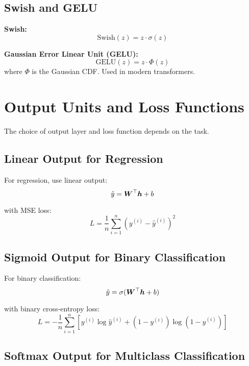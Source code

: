 \subsection{Swish and GELU}

\textbf{Swish:}
\begin{equation}
\text{Swish}(z) = z \cdot \sigma(z)
\end{equation}

\textbf{Gaussian Error Linear Unit (GELU):}
\begin{equation}
\text{GELU}(z) = z \cdot \Phi(z)
\end{equation}
where $\Phi$ is the Gaussian CDF. Used in modern transformers.

\section{Output Units and Loss Functions}
\label{sec:output-loss}

The choice of output layer and loss function depends on the task.

\subsection{Linear Output for Regression}

For regression, use linear output:
\begin{equation}
\hat{y} = \boldsymbol{W}^\top \boldsymbol{h} + b
\end{equation}

with MSE loss:
\begin{equation}
L = \frac{1}{n} \sum_{i=1}^{n} (y^{(i)} - \hat{y}^{(i)})^2
\end{equation}

\subsection{Sigmoid Output for Binary Classification}

For binary classification:
\begin{equation}
\hat{y} = \sigma(\boldsymbol{W}^\top \boldsymbol{h} + b)
\end{equation}

with binary cross-entropy loss:
\begin{equation}
L = -\frac{1}{n} \sum_{i=1}^{n} [y^{(i)} \log \hat{y}^{(i)} + (1-y^{(i)}) \log(1-\hat{y}^{(i)})]
\end{equation}

\subsection{Softmax Output for Multiclass Classification}

